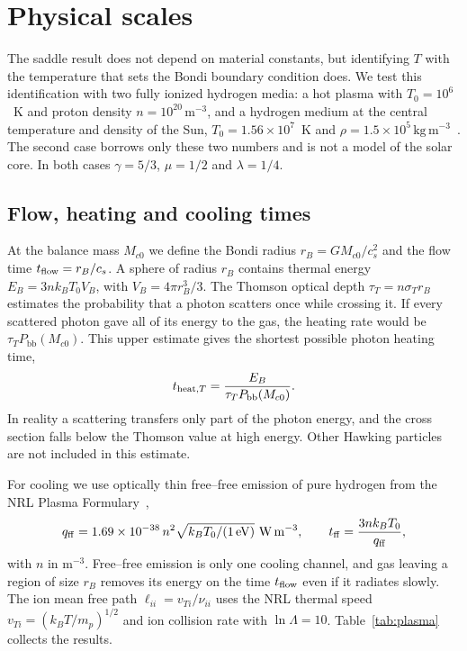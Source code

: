 \documentclass[11pt,a4paper]{article}
\newcommand{\Pbb}{P_{\mathrm{bb}}}
\newcommand{\Mc}{M_{c0}}
\begin{document}
\section{Physical scales}\label{sec:physical}
The saddle result does not depend on material constants, but identifying $T$ with the temperature that sets the Bondi boundary condition does. We test this identification with two fully ionized hydrogen media: a hot plasma with $T_0=10^6$~K and proton density $n=10^{20}\,\mathrm{m^{-3}}$, and a hydrogen medium at the central temperature and density of the Sun, $T_0=1.56\times10^7$~K and $\rho=1.5\times10^5\,\mathrm{kg\,m^{-3}}$~\cite{nasa}. The second case borrows only these two numbers and is not a model of the solar core. In both cases $\gamma=5/3$, $\mu=1/2$ and $\lambda=1/4$.

\subsection{Flow, heating and cooling times}
At the balance mass $\Mc$ we define the Bondi radius $r_B=G\Mc/c_s^2$ and the flow time $t_{\rm flow}=r_B/c_s$. A sphere of radius $r_B$ contains thermal energy $E_B=3nk_BT_0V_B$, with $V_B=4\pi r_B^3/3$. The Thomson optical depth $\tau_T=n\sigma_Tr_B$ estimates the probability that a photon scatters once while crossing it. If every scattered photon gave all of its energy to the gas, the heating rate would be $\tau_T\Pbb(\Mc)$. This upper estimate gives the shortest possible photon heating time,
\begin{equation*}
 t_{{\rm heat},T}=\frac{E_B}{\tau_T\Pbb(\Mc)}.
\end{equation*}
In reality a scattering transfers only part of the photon energy, and the cross section falls below the Thomson value at high energy. Other Hawking particles are not included in this estimate.

For cooling we use optically thin free--free emission of pure hydrogen from the NRL Plasma Formulary~\cite{nrl},
\begin{equation*}
 q_{\rm ff}=1.69\times10^{-38}\,n^2\sqrt{k_BT_0/(1\,{\rm eV})}\ \mathrm{W\,m^{-3}},\qquad
 t_{\rm ff}=\frac{3nk_BT_0}{q_{\rm ff}},
\end{equation*}
with $n$ in $\mathrm{m^{-3}}$. Free--free emission is only one cooling channel, and gas leaving a region of size $r_B$ removes its energy on the time $t_{\rm flow}$ even if it radiates slowly. The ion mean free path $\ell_{ii}=v_{Ti}/\nu_{ii}$ uses the NRL thermal speed $v_{Ti}=(k_BT/m_p)^{1/2}$ and ion collision rate with $\ln\Lambda=10$. Table~\ref{tab:plasma} collects the results.
\end{document}
